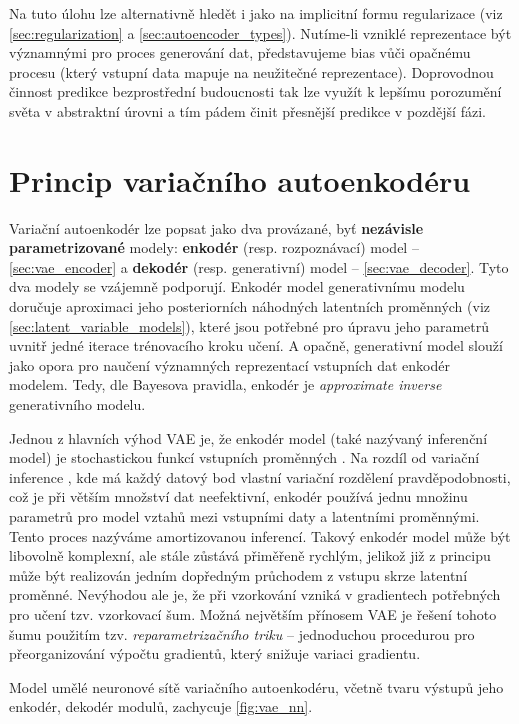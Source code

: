 Na tuto úlohu lze alternativně hledět i jako na implicitní formu regularizace (viz \autoref{sec:regularization} a \autoref{sec:autoencoder_types}). Nutíme-li vzniklé reprezentace být významnými pro proces generování dat, představujeme bias vůči opačnému procesu (který vstupní data mapuje na neužitečné reprezentace).
Doprovodnou činnost predikce bezprostřední budoucnosti tak lze využít k lepšímu porozumění světa v abstraktní úrovni a tím pádem činit přesnější predikce v pozdější fázi. \cite{Goodfellow2016}

\newpage
\section{Princip variačního autoenkodéru}
\label{sec:vae_principle}
Variační autoenkodér lze popsat jako dva provázané, byť \textbf{nezávisle parametrizované} modely: \textbf{enkodér} (resp. rozpoznávací) model – \autoref{sec:vae_encoder} a \textbf{dekodér} (resp. generativní) model – \autoref{sec:vae_decoder}.
Tyto dva modely se vzájemně podporují. Enkodér model generativnímu modelu doručuje aproximaci jeho posteriorních náhodných latentních proměnných (viz \autoref{sec:latent_variable_models}),
které jsou potřebné pro úpravu jeho parametrů uvnitř jedné iterace trénovacího kroku učení.
A opačně, generativní model slouží jako opora pro naučení významných reprezentací vstupních dat enkodér modelem.
Tedy, dle Bayesova pravidla, enkodér je \emph{approximate inverse} generativního modelu. \cite{Kingma2019}

Jednou z hlavních výhod VAE je, že enkodér model (také nazývaný inferenční model) je stochastickou funkcí vstupních proměnných \cite{Goodfellow2016}.
Na rozdíl od variační inference \cite{Kingma2016}, kde má každý datový bod vlastní variační rozdělení pravděpodobnosti, což je při větším množství dat neefektivní,
enkodér používá jednu množinu parametrů pro model vztahů mezi vstupními daty a latentními proměnnými. Tento proces nazýváme amortizovanou inferencí.
Takový enkodér model může být libovolně komplexní, ale stále zůstává přiměřeně rychlým, jelikož již z principu může být realizován jedním dopředným průchodem z vstupu skrze latentní proměnné.
Nevýhodou ale je, že při vzorkování vzniká v gradientech potřebných pro učení tzv. vzorkovací šum.
Možná největším přínosem VAE je řešení tohoto šumu použitím tzv. \emph{reparametrizačního triku} – jednoduchou procedurou pro přeorganizování výpočtu gradientů, který snižuje variaci gradientu. \cite{Kingma2019}

Model umělé neuronové sítě variačního autoenkodéru, včetně tvaru výstupů jeho enkodér, dekodér modulů, zachycuje \autoref{fig:vae_nn}.

